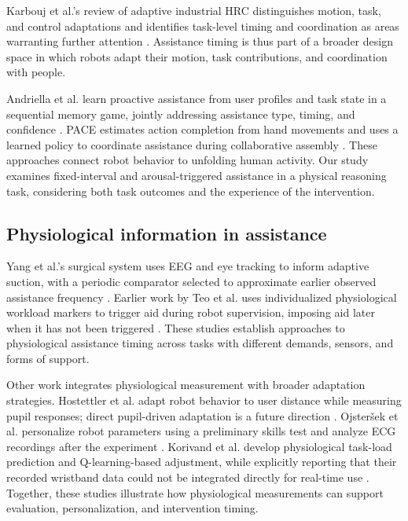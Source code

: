 \documentclass[sigconf,anonymous,balance=false]{aamas} %
\begin{document}
Karbouj et al.'s review of adaptive industrial HRC distinguishes motion, task, and control adaptations and identifies task-level timing and coordination as areas warranting further attention \cite{karbouj2026}. Assistance timing is thus part of a broader design space in which robots adapt their motion, task contributions, and coordination with people.

Andriella et al. learn proactive assistance from user profiles and task state in a sequential memory game, jointly addressing assistance type, timing, and confidence \cite{andriella2025}. PACE estimates action completion from hand movements and uses a learned policy to coordinate assistance during collaborative assembly \cite{delazzari2025}. These approaches connect robot behavior to unfolding human activity. Our study examines fixed-interval and arousal-triggered assistance in a physical reasoning task, considering both task outcomes and the experience of the intervention.

\subsection{Physiological information in assistance}

Yang et al.'s surgical system uses EEG and eye tracking to inform adaptive suction, with a periodic comparator selected to approximate earlier observed assistance frequency \cite{yang2024}. Earlier work by Teo et al. uses individualized physiological workload markers to trigger aid during robot supervision, imposing aid later when it has not been triggered \cite{teo2018}. These studies establish approaches to physiological assistance timing across tasks with different demands, sensors, and forms of support.

Other work integrates physiological measurement with broader adaptation strategies. Hostettler et al. adapt robot behavior to user distance while measuring pupil responses; direct pupil-driven adaptation is a future direction \cite{hostettler2025}. Ojsteršek et al. personalize robot parameters using a preliminary skills test and analyze ECG recordings after the experiment \cite{ojstersek2024}. Korivand et al. develop physiological task-load prediction and Q-learning-based adjustment, while explicitly reporting that their recorded wristband data could not be integrated directly for real-time use \cite{korivand2024}. Together, these studies illustrate how physiological measurements can support evaluation, personalization, and intervention timing.
\end{document}
